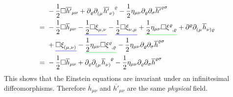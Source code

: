 \begin{equation}
    \begin{split}
        & -\frac{1}{2} \Box \overline{h'}_{\mu\nu} + \partial_\varrho \tensor{\partial}{_(_\mu}\tensor{\overline{h'}}{_\nu_)^\varrho}
        - \frac{1}{2} \eta_{\mu\nu}\partial_\varrho\partial_\sigma \overline{h'}^{\varrho\sigma} \\
        =\ & -\frac{1}{2}\Box\overline{h}_{\mu\nu} - \mathunderline{blue}{\frac{1}{2}\Box\tensor{\xi}{_\mu_,_\nu}}
        -\mathunderline{blue}{\frac{1}{2}\Box\tensor{\xi}{_\nu_,_\mu}}
        + \mathunderline{green}{\frac{1}{2} \eta_{\mu\nu}\Box\tensor{\xi}{^\varrho_,_\varrho}}
        + \partial^\varrho \tensor{\partial}{_(_\mu}\tensor{\overline{h}}{_\nu_)_\varrho} \\
        & + \mathunderline{blue}{\Box\tensor{\xi}{_(_\mu_,_\nu_)}}
        - \mathunderline{green}{\frac{1}{2}\eta_{\mu\nu}\Box\tensor{\xi}{^\varrho_,_\varrho}}
        - \frac{1}{2} \eta_{\mu\nu}\partial_\varrho\partial_\sigma \overline{h}^{\varrho\sigma} \\
        =\ & -\frac{1}{2} \Box \overline{h}_{\mu\nu} + \partial_\varrho \tensor{\partial}{_(_\mu}\tensor{\overline{h}}{_\nu_)^\varrho}
        - \frac{1}{2} \eta_{\mu\nu}\partial_\varrho\partial_\sigma \overline{h}^{\varrho\sigma}
    \end{split}
\end{equation}
This shows that the Einstein equations are invariant under an infinitesimal diffeomorphisms.
Therefore $\overline{h}_{\mu\nu}$ and $\overline{h'}_{\mu\nu}$ are the same \emph{physical} field.

